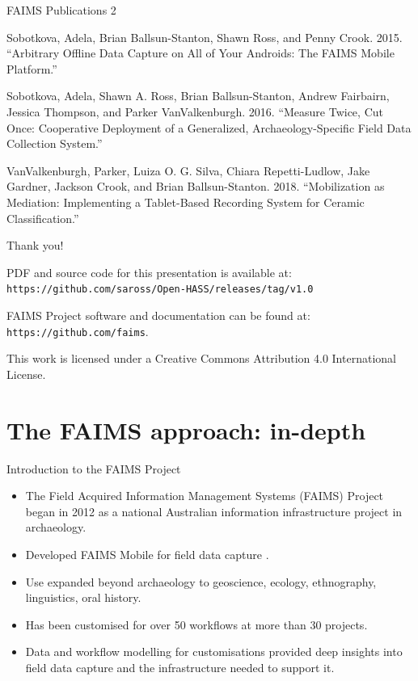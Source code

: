 \documentclass[aspectratio=169, 11pt]{beamer} %
\begin{document}
\begin{frame}{FAIMS Publications 2}
\begin{itemize}[label=\textbullet]
{\small
    \item Sobotkova, Adela, Brian Ballsun-Stanton, Shawn Ross, and Penny Crook. 2015. ``Arbitrary Offline Data Capture on All of Your Androids: The FAIMS Mobile Platform.''
\item Sobotkova, Adela, Shawn A. Ross, Brian Ballsun-Stanton, Andrew Fairbairn, Jessica Thompson, and Parker VanValkenburgh. 2016. ``Measure Twice, Cut Once: Cooperative Deployment of a Generalized, Archaeology-Specific Field Data Collection System.'' 
\item VanValkenburgh, Parker, Luiza O. G. Silva, Chiara Repetti-Ludlow, Jake Gardner, Jackson Crook, and Brian Ballsun-Stanton. 2018. ``Mobilization as Mediation: Implementing a Tablet-Based Recording System for Ceramic Classification.''} 
\end{itemize}
    
\end{frame}
\begin{frame}{Thank you!}


PDF and source code for this presentation is available at: 
\texttt{https://github.com/saross/Open-HASS/releases/tag/v1.0}

FAIMS Project software and documentation can be found at:
\texttt{https://github.com/faims}.

This work is licensed under a Creative Commons Attribution 4.0 International License.

\end{frame}

\section{The FAIMS approach: in-depth}

\begin{frame}{Introduction to the FAIMS Project}
    \begin{itemize}[label=\textbullet]
        \item The Field Acquired Information Management Systems (FAIMS) Project began in 2012 as a national Australian information infrastructure project in archaeology.
        \item Developed FAIMS Mobile for field data capture \cite{Ballsun-Stanton2018-zd}.
        \item Use expanded beyond archaeology to geoscience, ecology, ethnography, linguistics, oral history.
        \item Has been customised for over 50 workflows at more than 30 projects. 
        \item Data and workflow modelling for customisations provided deep insights into field data capture and the infrastructure needed to support it.
    \end{itemize}
\end{frame}
\end{document}
